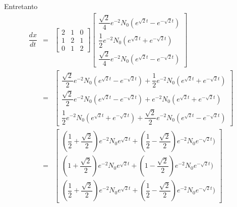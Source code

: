 Entretanto
\[\begin{array}{rclcl}
\dfrac{dx}{dt} &=&
\left[\begin{array}{ccc}
2 & 1 & 0 \\[0.5cm]
1 & 2 & 1 \\[0.5cm]
0 & 1 & 2 
\end{array}\right]
\left[\begin{array}{c}
\dfrac{\sqrt{2}}{4}e^{-2}N_{0}(e^{\sqrt{2}t} - e^{- \sqrt{2}t}) \\[0.5cm]
\dfrac{1}{2}e^{-2}N_{0}(e^{\sqrt{2}t} + e^{- \sqrt{2}t}) \\[0.5cm]
\dfrac{\sqrt{2}}{4}e^{-2}N_{0}(e^{\sqrt{2}t} - e^{- \sqrt{2}t}) 
\end{array}\right] \\[0.5cm]
&=&
\left[\begin{array}{c}
\dfrac{\sqrt{2}}{2}e^{-2}N_{0}(e^{\sqrt{2}t} - e^{- \sqrt{2}t}) + \dfrac{1}{2}e^{-2}N_{0}(e^{\sqrt{2}t} + e^{- \sqrt{2}t})  \\[0.5cm]
\dfrac{\sqrt{2}}{2}e^{-2}N_{0}(e^{\sqrt{2}t} - e^{- \sqrt{2}t}) + e^{-2}N_{0}(e^{\sqrt{2}t} + e^{- \sqrt{2}t}) \\[0.5cm]
\dfrac{1}{2}e^{-2}N_{0}(e^{\sqrt{2}t} + e^{- \sqrt{2}t}) + \dfrac{\sqrt{2}}{2}e^{-2}N_{0}(e^{\sqrt{2}t} - e^{- \sqrt{2}t})
\end{array}\right] \\[0.5cm]
&=&
\left[\begin{array}{c}
\left( \dfrac{1}{2} + \dfrac{\sqrt{2}}{2} \right)e^{-2}N_{0}e^{\sqrt{2}t} + \left( \dfrac{1}{2} - \dfrac{\sqrt{2}}{2}\right)e^{-2}N_{0}e^{- \sqrt{2}t}) \\[0.5cm]
\left(1 + \dfrac{\sqrt{2}}{2} \right) e^{-2}N_{0}e^{\sqrt{2}t} + \left( 1 - \dfrac{\sqrt{2}}{2}\right)e^{-2}N_{0}e^{- \sqrt{2}t}) \\[0.5cm]
\left( \dfrac{1}{2} + \dfrac{\sqrt{2}}{2} \right)e^{-2}N_{0}e^{\sqrt{2}t} + \left( \dfrac{1}{2} - \dfrac{\sqrt{2}}{2}\right)e^{-2}N_{0}e^{- \sqrt{2}t})
\end{array}\right]
\end{array}\]

